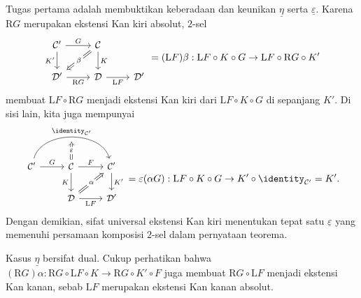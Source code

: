 \begin{bukti}
	Tugas pertama adalah membuktikan keberadaan dan keunikan
	$\underline{\eta}$ serta $\underline{\varepsilon}$. Karena $\mathrm{R}G$
	merupakan ekstensi Kan kiri absolut, $2$-sel
	\[\begin{tikzcd}
		\mathcal{C}' \arrow[r, "G"] \arrow[d, "{K'}"'] & \mathcal{C} \arrow[d, "K"] \arrow[Rightarrow, ld, "\beta" description] & \\
		\mathcal{D}' \arrow[r, "{\mathrm{R}G}"'] & \mathcal{D} \arrow[r, "{\mathrm{L}F}"'] & \mathcal{D}'
	\end{tikzcd} = (\mathrm{L}F)\beta : \mathrm{L}F \circ K \circ G \to \mathrm{L}F \circ \mathrm{R}G \circ K' \]
	membuat $\mathrm{L}F \circ \mathrm{R}G$ menjadi ekstensi Kan kiri dari
	$\mathrm{L}F \circ K \circ G$ di sepanjang $K'$. Di sisi lain, kita juga
	mempunyai
	\[\begin{tikzcd}[every cell/.append style = {font = \small}]
		\mathcal{C}' \arrow[r, "G"] \arrow[bend left=75, rr, "{\identity_{\mathcal{C}'}}", ""' {name=I}] & \mathcal{C} \arrow[r, "F"] \arrow[d, "K"'] \arrow[Rightarrow, to=I, "\varepsilon" description] & \mathcal{C}' \arrow[d, "{K'}"] \\
		& \mathcal{D} \arrow[r, "{\mathrm{L}F}"'] \arrow[Rightarrow, ru, "\alpha" description] & \mathcal{D}'
	\end{tikzcd} = \varepsilon(\alpha G) : \mathrm{L}F \circ K \circ G \to K' \circ \identity_{\mathcal{C}'} = K' . \]
	Dengan demikian, sifat universal ekstensi Kan kiri menentukan tepat satu
	$\underline{\varepsilon}$ yang memenuhi persamaan komposisi $2$-sel dalam
	pernyataan teorema.

	Kasus $\underline{\eta}$ bersifat dual. Cukup perhatikan bahwa
	$(\mathrm{R}G)\alpha:
	\mathrm{R}G \circ \mathrm{L}F \circ K \to
	\mathrm{R}G \circ K' \circ F$ juga membuat
	$\mathrm{R}G \circ \mathrm{L}F$ menjadi ekstensi Kan kanan, sebab
	$\mathrm{L}F$ merupakan ekstensi Kan kanan absolut.


\end{bukti}
